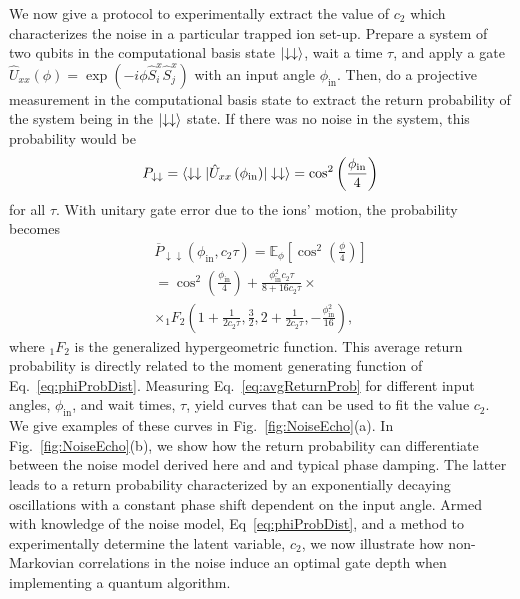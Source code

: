 \documentclass[prx,aps,twocolumn,showpacs,superscriptaddress,10pt]{revtex4-1}
\begin{document}
We now give a protocol to experimentally extract the value of $c_{2}$ which characterizes the noise in a particular trapped ion set-up. Prepare a system of two qubits in the computational basis state $\ket{\downarrow\downarrow}$, wait a time $\tau$, and apply a gate
$\hat{U}_{xx}\left(\phi\right)=\exp\left(-i\phi\hat{S}_{i}^{x}\hat{S}_{j}^{x}\right)$ with an input angle $\phi_\textrm{in}$. Then, do a projective measurement in the computational basis state to extract the return probability of the system being in the $\ket{\downarrow\downarrow}$ state. If there was no noise in the system, this probability would be
\begin{equation}
	P_{\downarrow\downarrow}=\braket{\downarrow\downarrow\lvert\hat{U}_{xx}\left(\phi_\textrm{in}\right)\rvert\downarrow\downarrow}=\cos^{2}\left(\frac{\phi_\textrm{in}}{4}\right)
\end{equation} for all $\tau$. With unitary gate error due to the ions' motion, the probability becomes
\begin{multline}\label{eq:avgReturnProb}
	\overline{P}_{\downarrow\downarrow}\left(\phi_\textrm{in},c_{2}\tau\right) = \mathbb{E}_{\phi}\left[\cos^{2}\left(\frac{\phi}{4}\right)\right]\\
	=   \cos^{2}\left(\frac{\phi_\textrm{in}}{4}\right)
	+ \frac{\phi_\textrm{in}^{2}c_{2}\tau}{8+16c_{2}\tau}\times\\
	 \times {}_{1}F_{2} (1 + \frac{1}{2c_{2}\tau}, \frac{3}{2}, 2 + \frac{1}{2 c_{2}\tau}, -\frac{\phi_\textrm{in}^{2}}{16}),	
\end{multline}
where ${}_{1}F_{2}$ is the generalized hypergeometric function. This average return probability is directly related to the moment generating function of Eq.~\eqref{eq:phiProbDist}. Measuring Eq.~\eqref{eq:avgReturnProb} for different input angles, $\phi_\textrm{in}$, and wait times, $\tau$, yield curves that can be used to fit the value $c_{2}$. We give examples of these curves in Fig.~\ref{fig:NoiseEcho}(a). In Fig.~\ref{fig:NoiseEcho}(b), we show how the return probability can differentiate between the noise model derived here and and typical phase damping. The latter leads to a return probability characterized by an exponentially decaying oscillations with a constant phase shift dependent on the input angle. Armed with knowledge of the noise model, Eq~\eqref{eq:phiProbDist}, and a method to experimentally determine the latent variable, $c_{2}$, we now illustrate how non-Markovian correlations in the noise induce an optimal gate depth when implementing a quantum algorithm.
\end{document}
